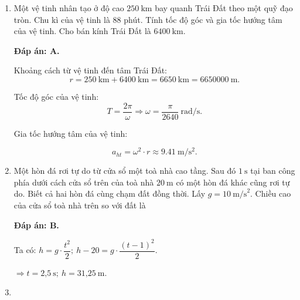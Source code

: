 \begin{enumerate}[label=\bfseries Câu \arabic*:]
{		
	}
	\item {}
	
	\cauhoi
	{Một vệ tinh nhân tạo ở độ cao $\SI{250}{\kilo\meter}$ bay quanh Trái Đất theo một quỹ đạo tròn. Chu kì của vệ tinh là 88 phút. Tính tốc độ góc và gia tốc hướng tâm của vệ tinh. Cho bán kính Trái Đất là $\SI{6400}{\kilo\meter}$.
	}
	\loigiai
	{	\textbf{Đáp án: A.}
		
		Khoảng cách từ vệ tinh đến tâm Trái Đất: 
		$$r=\SI{250}{\kilo\meter}+\SI{6400}{\kilo\meter} =\SI{6650}{\kilo\meter}=\SI{6650000}{\meter}.$$
		
		Tốc độ góc của vệ tinh:
		$$T=\frac{2\pi}{\omega} \Rightarrow \omega = \frac{\pi}{2640}\ \text{rad/s}.$$ 
		
		Gia tốc hướng tâm của vệ tinh: 
		
		$$a_{ht}=\omega^2 \cdot r \approx \SI{9,41}{ \meter/\second^2}.$$
		
		
	
	}
	\item {}
	
	\cauhoi
	{Một hòn đá rơi tự do từ cửa sổ một toà nhà cao tầng. Sau đó $1\ \text{s}$ tại ban công phía dưới cách cửa sổ trên của toà nhà $20\ \text{m}$ có một hòn đá khác cũng rơi tự do. Biết cả hai hòn đá cùng chạm đất đồng thời. Lấy $g=10\ \text{m/s}^2$. Chiều cao của cửa sổ toà nhà trên so với đất là	
	}
	\loigiai
	{\textbf{Đáp án: B.}	
		
		Ta có: $h=g\cdot \dfrac{t^2}{2}; \ h-20=g\cdot \dfrac{\left(t-1 \right)^2 }{2}$.
		
		$\Rightarrow t=\text{2,5}\ \text{s}; \ h=\text{31,25}\ \text{m}$.  
		
		
	}
	\item {}
	

\end{enumerate}
